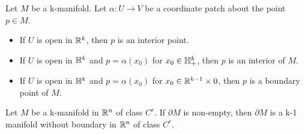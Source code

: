 \begin{lemma}
    Let $M$ be a k-manifold. Let $\alpha:U\longrightarrow V$ be a coordinate patch about the point $p\in M$.
    \begin{itemize}
        \item If $U$ is open in $\mathbb{R}^k$, then $p$ is an interior point.
        \item If $U$ is open in $\mathbb{H}^k$ and $p=\alpha(x_0)$ for $x_0\in \mathbb{H}^k_+$, then $p$ is an interior of $M$.
        \item If $U$ is open in $\mathbb{H}^k$ and $p=\alpha(x_0)$ for $x_0\in \mathbb{R}^{k-1}\times 0$, then $p$ is a boundary point of $M$.
    \end{itemize}
\end{lemma}

\begin{theorem}
    Let $M$ be a k-manifold in $\mathbb{R}^n$ of class $C^r$. If $\partial M$ is non-empty, then $\partial M$ is a k-1 manifold without boundary in $\mathbb{R}^n$ of class $C^r$.
\end{theorem}

